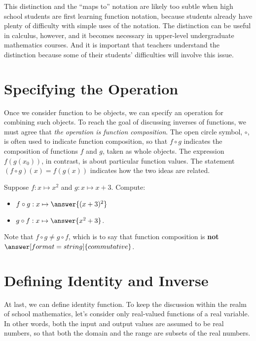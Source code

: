 \documentclass{ximera}
\begin{document}
This distinction and the ``maps to'' notation are likely too subtle when high school students are first learning function notation, because students already have plenty of difficulty with simple uses of the notation.  The distinction can be useful in calculus, however, and it becomes necessary in upper-level undergraduate mathematics courses.  And it is important that teachers understand the distinction because some of their students' difficulties will involve this issue.


\section*{Specifying the Operation}
Once we consider function to be objects, we can specify an operation for combining such objects.  To reach the goal of discussing inverses of functions, we must agree that \emph{the operation is function composition}.  The open circle symbol, $\circ$, is often used to indicate function composition, so that $f\circ g$  indicates the composition of functions $f$ and $g$, taken as whole objects.  The expression $f(g(x_0))$, in contrast, is about particular function values.  The statement $(f\circ g)(x) = f(g(x))$ indicates how the two ideas are related.  

\begin{question}
Suppose $f: x\mapsto x^2$ and $g: x\mapsto x+3$.  Compute: 
\begin{itemize}
\item $f\circ g: x\mapsto \answer{(x+3)^2}$ 
\item $g\circ f: x\mapsto \answer{x^2+3}$. 
\end{itemize}

\begin{question}
Note that $f\circ g \neq g\circ f$, which is to say that function composition is \textbf{not} 
$\answer[format=string]{commutative}$.  
\end{question}
\end{question}

\section*{Defining Identity and Inverse}
At last, we can define identity function.  To keep the discussion within the realm of school mathematics, let's consider only real-valued functions of a real variable.  In other words, both the input and output values are assumed to be real numbers, so that both the domain and the range are subsets of the real numbers.  
\end{document}
